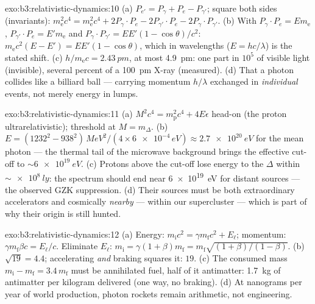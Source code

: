 \begin{solution}{exo:b3:relativistic-dynamics:10}
(a) $P_{e'} = P_\gamma + P_e - P_{\gamma'}$; square both sides
(invariants): $m_{\text{e}}^2c^4 = m_{\text{e}}^2c^4 + 2P_\gamma\!
\cdot\!P_e - 2P_{\gamma'}\!\cdot\!P_e - 2P_\gamma\!\cdot\!P_{\gamma'}$.
(b) With $P_\gamma\!\cdot\!P_e = E m_{\text{e}}$,
$P_{\gamma'}\!\cdot\!P_e = E'm_{\text{e}}$ and $P_\gamma\!\cdot\!
P_{\gamma'} = EE'(1 - \cos\theta)/c^2$:
$m_{\text{e}}c^2(E - E') = EE'(1 - \cos\theta)$, which in wavelengths
($E = hc/\lambda$) is the stated shift. (c) $h/m_{\text{e}}c =
\qty{2.43}{pm}$, at most \qty{4.9}{pm}: one part in $10^5$ of visible
light (invisible), several percent of a \qty{100}{pm} X-ray
(measured). (d) That a photon collides like a billiard ball ---
carrying momentum $h/\lambda$ exchanged in \emph{individual} events,
not merely energy in lumps.
\end{solution}

\begin{solution}{exo:b3:relativistic-dynamics:11}
(a) $M^2c^4 = m_{\text{p}}^2c^4 + 4E\epsilon$ head-on (the proton
ultrarelativistic); threshold at $M = m_\Delta$. (b) $E =
(1232^2 - 938^2)\,\unit{MeV^2}/(4 \times \num{6e-4}\,\unit{eV})
\approx \qty{2.7e20}{eV}$ for the mean photon --- the thermal tail of
the microwave background brings the effective cut-off to
$\sim\qty{6e19}{eV}$. (c) Protons above the cut-off lose energy to
the $\Delta$ within $\sim\qty{e8}{ly}$: the spectrum should end near
\qty{6e19}{eV} for distant sources --- the observed GZK suppression.
(d) Their sources must be both extraordinary accelerators and
cosmically \emph{nearby} --- within our supercluster --- which is
part of why their origin is still hunted.
\end{solution}

\begin{solution}{exo:b3:relativistic-dynamics:12}
(a) Energy: $m_{\text{i}}c^2 = \gamma m_{\text{f}}c^2 + E_\ell$;
momentum: $\gamma m_{\text{f}}\beta c = E_\ell/c$. Eliminate
$E_\ell$: $m_{\text{i}} = \gamma(1 + \beta)m_{\text{f}} =
m_{\text{f}}\sqrt{(1+\beta)/(1-\beta)}$. (b) $\sqrt{19} = 4.4$;
accelerating \emph{and} braking squares it: $19$. (c) The consumed
mass $m_{\text{i}} - m_{\text{f}} = 3.4\,m_{\text{f}}$ must be
annihilated fuel, half of it antimatter: \qty{1.7}{kg} of antimatter
per kilogram delivered (one way, no braking). (d) At nanograms per
year of world production, photon rockets remain arithmetic, not
engineering.
\end{solution}

